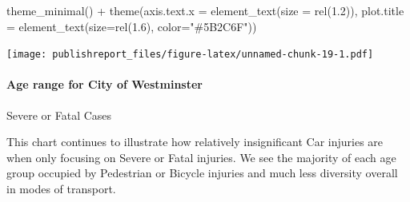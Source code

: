 \documentclass[
]{article}
\newenvironment{Shaded}{\begin{snugshade}}{\end{snugshade}}
\newcommand{\AttributeTok}[1]{\textcolor[rgb]{0.77,0.63,0.00}{#1}}
\newcommand{\FloatTok}[1]{\textcolor[rgb]{0.00,0.00,0.81}{#1}}
\newcommand{\FunctionTok}[1]{\textcolor[rgb]{0.00,0.00,0.00}{#1}}
\newcommand{\NormalTok}[1]{#1}
\newcommand{\SpecialCharTok}[1]{\textcolor[rgb]{0.00,0.00,0.00}{#1}}
\newcommand{\StringTok}[1]{\textcolor[rgb]{0.31,0.60,0.02}{#1}}
\begin{document}
\begin{Shaded}
\begin{Highlighting}[]
    \FunctionTok{theme\_minimal}\NormalTok{() }\SpecialCharTok{+}
    \FunctionTok{theme}\NormalTok{(}\AttributeTok{axis.text.x =} \FunctionTok{element\_text}\NormalTok{(}\AttributeTok{size =} \FunctionTok{rel}\NormalTok{(}\FloatTok{1.2}\NormalTok{)),}
          \AttributeTok{plot.title =} \FunctionTok{element\_text}\NormalTok{(}\AttributeTok{size=}\FunctionTok{rel}\NormalTok{(}\FloatTok{1.6}\NormalTok{), }\AttributeTok{color=}\StringTok{"\#5B2C6F"}\NormalTok{))}
\end{Highlighting}
\end{Shaded}

\texttt{[image: publishreport\_files/figure-latex/unnamed-chunk-19-1.pdf]}

\hypertarget{age-range-for-city-of-westminster}{%
\paragraph{Age range for City of
Westminster}\label{age-range-for-city-of-westminster}}

Severe or Fatal Cases

This chart continues to illustrate how relatively insignificant Car
injuries are when only focusing on Severe or Fatal injuries. We see the
majority of each age group occupied by Pedestrian or Bicycle injuries
and much less diversity overall in modes of transport.
\end{document}
